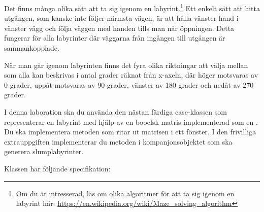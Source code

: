 Det finns många olika sätt att ta sig igenom en labyrint.\footnote{Om du är intresserad, läs om olika algoritmer för att ta sig igenom en labyrint här: \url{https://en.wikipedia.org/wiki/Maze\_solving\_algorithm}} Ett enkelt sätt att hitta utgången, som kanske inte följer närmsta vägen, är att hålla vänster hand i vänster vägg och följa väggen med handen tills man når öppningen. Detta fungerar för alla labyrinter där väggarna från ingången till utgången är sammankopplade.

När man går igenom labyrinten finns det fyra olika riktningar att välja mellan som alla kan beskrivas i antal grader räknat från x-axeln, där höger motsvaras av 0 grader, uppåt motsvaras av 90 grader, vänster av 180 grader och nedåt av 270 grader.

I denna laboration ska du använda den nästan färdiga case-klassen  som representerar en labyrint med hjälp av en booelsk matris implementerad som en . Du ska implementera metoden  som ritar ut matrisen i ett fönster. I den frivilliga extrauppgiften implementerar du metoden  i kompanjonsobjektet  som ska generera slumplabyrinter.


Klassen  har följande specifikation:

